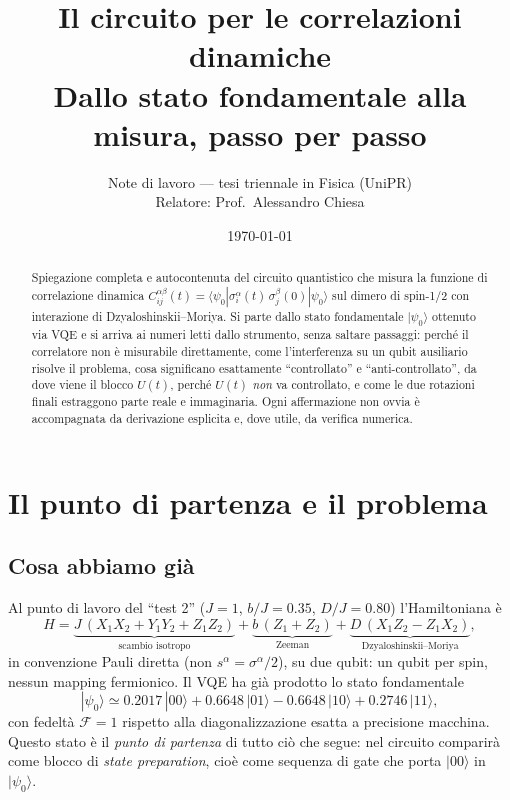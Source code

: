 \documentclass[11pt,a4paper]{article}
\title{Il circuito per le correlazioni dinamiche\\
\large Dallo stato fondamentale alla misura, passo per passo}
\author{Note di lavoro --- tesi triennale in Fisica (UniPR)\\
Relatore: Prof.\ Alessandro Chiesa}
\date{\today}
\begin{document}
\maketitle

\begin{abstract}
\noindent
Spiegazione completa e autocontenuta del circuito quantistico che misura la funzione di
correlazione dinamica $C_{ij}^{\alpha\beta}(t)=\langle\psi_0|\sigma_i^\alpha(t)\,
\sigma_j^\beta(0)|\psi_0\rangle$ sul dimero di spin-1/2 con interazione di
Dzyaloshinskii--Moriya. Si parte dallo stato fondamentale $|\psi_0\rangle$ ottenuto via VQE e si
arriva ai numeri letti dallo strumento, senza saltare passaggi: perché il correlatore non è
misurabile direttamente, come l'interferenza su un qubit ausiliario risolve il problema, cosa
significano esattamente ``controllato'' e ``anti-controllato'', da dove viene il blocco $U(t)$,
perché $U(t)$ \emph{non} va controllato, e come le due rotazioni finali estraggono parte reale e
immaginaria. Ogni affermazione non ovvia è accompagnata da derivazione esplicita e, dove utile,
da verifica numerica.
\end{abstract}

\tableofcontents

\section{Il punto di partenza e il problema}

\subsection{Cosa abbiamo già}

Al punto di lavoro del ``test 2'' ($J=1$, $b/J=0.35$, $D/J=0.80$) l'Hamiltoniana è
\begin{equation}
H = \underbrace{J\,(X_1X_2+Y_1Y_2+Z_1Z_2)}_{\text{scambio isotropo}}
  + \underbrace{b\,(Z_1+Z_2)}_{\text{Zeeman}}
  + \underbrace{D\,(X_1Z_2-Z_1X_2)}_{\text{Dzyaloshinskii--Moriya}},
\label{eq:H}
\end{equation}
in convenzione Pauli diretta (non $s^\alpha=\sigma^\alpha/2$), su due qubit: un qubit per spin,
nessun mapping fermionico. Il VQE ha già prodotto lo stato fondamentale
\begin{equation}
|\psi_0\rangle \simeq 0.2017\,|00\rangle + 0.6648\,|01\rangle - 0.6648\,|10\rangle + 0.2746\,|11\rangle,
\end{equation}
con fedeltà $\mathcal F=1$ rispetto alla diagonalizzazione esatta a precisione macchina. Questo
stato è il \emph{punto di partenza} di tutto ciò che segue: nel circuito comparirà come blocco di
\emph{state preparation}, cioè come sequenza di gate che porta $|00\rangle$ in $|\psi_0\rangle$.
\end{document}
